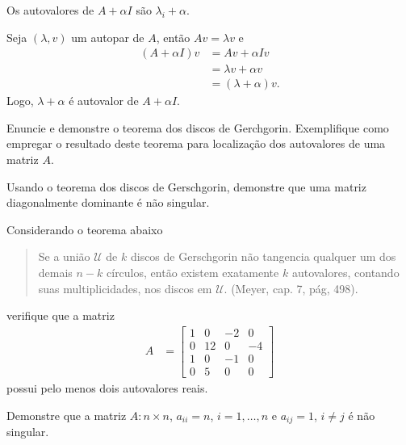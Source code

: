 \documentclass[a4paper,12pt, leqno, answers]{exam}
\begin{document}
\begin{questions}
    \question Os autovalores de $A + \alpha I$ s\~{a}o $\lambda_i + \alpha$.
    \begin{solution}
        Seja $(\lambda, v)$ um autopar de $A$, ent\~{a}o $A v = \lambda v$ e
        \begin{align*}
            (A + \alpha I) v &= A v + \alpha I v \\
            &= \lambda v + \alpha v \\
            &= (\lambda + \alpha)v.
        \end{align*}
        Logo, $\lambda + \alpha$ \'{e} autovalor de $A + \alpha I$.
    \end{solution}

    \question Enuncie e demonstre o teorema dos discos de Gerchgorin. Exemplifique como empregar o resultado deste teorema para localiza\c{c}\~{a}o dos autovalores de uma matriz $A$.
    \begin{solution}
    \end{solution}

    \question Usando o teorema dos discos de Gerschgorin, demonstre que uma matriz diagonalmente dominante \'{e} n\~{a}o singular.
    \begin{solution}
    \end{solution}

    \question Considerando o teorema abaixo
    \begin{quote}
        Se a uni\~{a}o $\mathcal{U}$ de $k$ discos de Gerschgorin n\~{a}o tangencia qualquer um dos demais $n - k$ c\'{i}rculos, ent\~{a}o existem exatamente $k$ autovalores, contando suas multiplicidades, nos discos em $\mathcal{U}$. (Meyer\nocite{Meyer:2000:matrix}, cap. 7, p\'{a}g, 498).
    \end{quote}
    verifique que a matriz
    \begin{align*}
        A &= \begin{bmatrix}
            1 & 0 & -2 & 0 \\
            0 & 12 & 0 & -4 \\
            1 & 0 & -1 & 0 \\
            0 & 5 & 0 & 0
        \end{bmatrix}
    \end{align*}
    possui pelo menos dois autovalores reais.
    \begin{solution}
    \end{solution}

    \question Demonstre que a matriz $A : n \times n$, $a_{ii} = n$, $i = 1, \ldots, n$ e $a_{ij} = 1$, $i \neq j$ \'{e} n\~{a}o singular.
    \begin{solution}
    \end{solution}
\end{questions}


\end{document}

